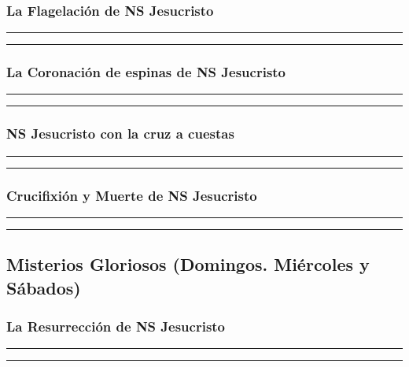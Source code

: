\documentclass[11pt,a4paper]{report}
\begin{document}
    \subsubsection*{La Flagelación de NS Jesucristo}
    
    
    \rule{\textwidth}{0.5pt}
    
    \rule{\textwidth}{0.5pt}
    

    \subsubsection*{La Coronación de espinas de NS Jesucristo}
    
    
    \rule{\textwidth}{0.5pt}
    
    \rule{\textwidth}{0.5pt}
    

    \subsubsection*{NS Jesucristo con la cruz a cuestas}
    
    
    \rule{\textwidth}{0.5pt}
    
    \rule{\textwidth}{0.5pt}
    

    \subsubsection*{Crucifixión y Muerte de NS Jesucristo}
    
    
    \rule{\textwidth}{0.5pt}
    
    \rule{\textwidth}{0.5pt}
    

    

    \subsection*{Misterios Gloriosos (Domingos. Miércoles y Sábados)}

    \subsubsection*{La Resurrección de NS Jesucristo}
    
    
    \rule{\textwidth}{0.5pt}
    
    \rule{\textwidth}{0.5pt}
    
\end{document}
